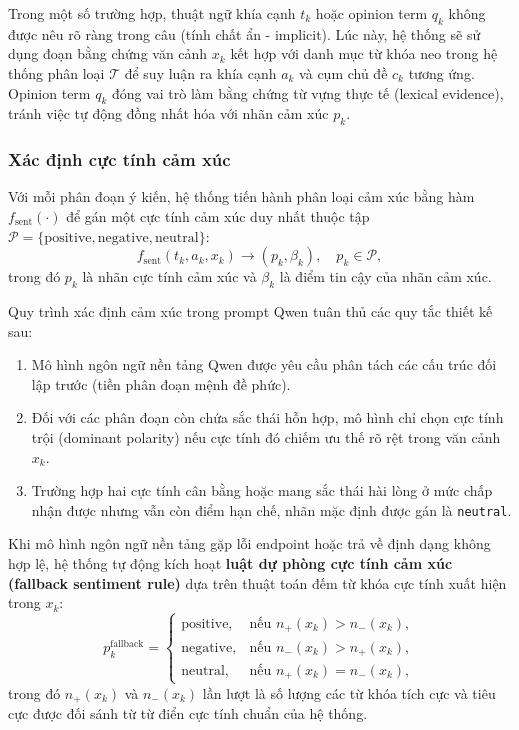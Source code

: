 Trong một số trường hợp, thuật ngữ khía cạnh $t_k$ hoặc opinion term $q_k$ không được nêu rõ ràng trong câu (tính chất ẩn - implicit). Lúc này, hệ thống sẽ sử dụng đoạn bằng chứng văn cảnh $x_k$ kết hợp với danh mục từ khóa neo trong hệ thống phân loại $\mathcal{T}$ để suy luận ra khía cạnh $a_k$ và cụm chủ đề $c_k$ tương ứng. Opinion term $q_k$ đóng vai trò làm bằng chứng từ vựng thực tế (lexical evidence), tránh việc tự động đồng nhất hóa với nhãn cảm xúc $p_k$.

\subsubsection{Xác định cực tính cảm xúc}
\label{subsubsec:method1-sentiment-polarity}

Với mỗi phân đoạn ý kiến, hệ thống tiến hành phân loại cảm xúc bằng hàm $f_{\mathrm{sent}}(\cdot)$ để gán một cực tính cảm xúc duy nhất thuộc tập $\mathcal{P} = \{\mathrm{positive}, \mathrm{negative}, \mathrm{neutral}\}$:
\begin{equation}
f_{\mathrm{sent}}(t_k, a_k, x_k) \rightarrow (p_k, \beta_k), \quad p_k \in \mathcal{P},
\label{eq:method1-sentiment-classifier}
\end{equation}
trong đó $p_k$ là nhãn cực tính cảm xúc và $\beta_k$ là điểm tin cậy của nhãn cảm xúc.

Quy trình xác định cảm xúc trong prompt Qwen tuân thủ các quy tắc thiết kế sau:
\begin{enumerate}[leftmargin=1.2cm]
    \item Mô hình ngôn ngữ nền tảng Qwen được yêu cầu phân tách các cấu trúc đối lập trước (tiền phân đoạn mệnh đề phức).
    \item Đối với các phân đoạn còn chứa sắc thái hỗn hợp, mô hình chỉ chọn cực tính trội (dominant polarity) nếu cực tính đó chiếm ưu thế rõ rệt trong văn cảnh $x_k$.
    \item Trường hợp hai cực tính cân bằng hoặc mang sắc thái hài lòng ở mức chấp nhận được nhưng vẫn còn điểm hạn chế, nhãn mặc định được gán là \texttt{neutral}.
\end{enumerate}

Khi mô hình ngôn ngữ nền tảng gặp lỗi endpoint hoặc trả về định dạng không hợp lệ, hệ thống tự động kích hoạt \textbf{luật dự phòng cực tính cảm xúc (fallback sentiment rule)} dựa trên thuật toán đếm từ khóa cực tính xuất hiện trong $x_k$:
\begin{equation}
p_k^{\mathrm{fallback}} = \begin{cases}
\mathrm{positive}, & \text{nếu } n_{+}(x_k) > n_{-}(x_k),\\
\mathrm{negative}, & \text{nếu } n_{-}(x_k) > n_{+}(x_k),\\
\mathrm{neutral}, & \text{nếu } n_{+}(x_k) = n_{-}(x_k),
\end{cases}
\label{eq:method1-fallback-sentiment}
\end{equation}
trong đó $n_{+}(x_k)$ và $n_{-}(x_k)$ lần lượt là số lượng các từ khóa tích cực và tiêu cực được đối sánh từ từ điển cực tính chuẩn của hệ thống.


